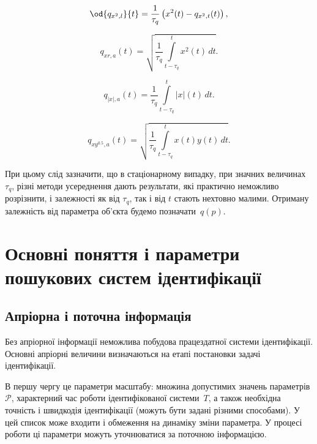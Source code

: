 \begin{equation}
\od{q_{x^2,l}}{t}
=
\frac{1}{\tau_q} \left( x^2(t) - q_{x^2,t}(t) \right)
,
\label{atu:eq:qx2l}
\end{equation}

\begin{equation}
  q_{xr,a}(t) =
  \sqrt{
    \frac{1}{\tau_q}
    \int\limits_{t-\tau_q}^{t} x^2(t) \, dt
  }.
  \label{atu:eq:qxra}
\end{equation}

\begin{equation}
  q_{|x|,a}(t) =
  \frac{1}{\tau_q}
  \int\limits_{t-\tau_q}^{t} |x|(t) \, dt
  .
  \label{atu:eq:qxma}
\end{equation}

\begin{equation}
  q_{xy^{0.5},a}(t) =
  \sqrt{
    \frac{1}{\tau_q}
    \int\limits_{t-\tau_q}^{t} x(t)y(t) \, dt
  }
  .
  \label{atu:eq:qxy05a}
\end{equation}

При цьому слід зазначити, що в стаціонарному випадку, при значних
величинах
$ \tau_q $, різні методи усереднення дають результати, які практично неможливо
розрізнити, і залежності як від
$ \tau_q $, так і від
$ t $ стають нехтовно малими. Отриману залежність від
параметра об'єкта будемо позначати~$q(p)$.





\section{Основні поняття і параметри пошукових систем ідентифікації}%

\subsection{Апріорна і поточна інформація}%

Без апріорної інформації неможлива побудова працездатної системи ідентифікації.
Основні апріорні величини визначаються на етапі постановки задачі
ідентифікації.

В першу чергу це параметри масштабу: множина допустимих значень
параметрів \label{atu:d:p_set} \(\mathcal{P} \), характерний час роботи
ідентифікованої системи~$T$,
а також необхідна точність і швидкодія ідентифікації (можуть
бути задані різними способами). У цей список може входити і
обмеження на динаміку зміни параметра. У процесі роботи ці
параметри можуть уточнюватися за поточною інформацією.

